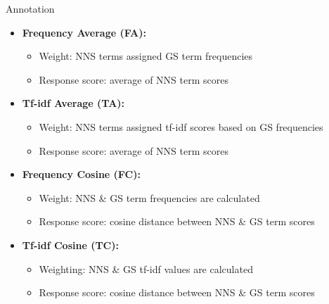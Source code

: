 \documentclass[final,t]{beamer}
\begin{document}
\begin{frame}{}
\begin{columns}[t]
\begin{column}{.64\linewidth}
\begin{columns}
\begin{column}{.48\linewidth}
\begin{block}{Annotation}
\begin{center}
\begin{minipage}{.78\textwidth}
  \begin{mdframed}[innertopmargin=15pt,innerbottommargin=15pt,roundcorner=10pt]
  \begin{center}
  \begin{minipage}{.9\textwidth}
    \begin{itemize}
    \item \textbf{Frequency Average (FA):} 
        \begin{itemize}
        \item Weight: NNS terms assigned GS term frequencies
        \item Response score: average of NNS term scores
        \end{itemize}
      \item \textbf{Tf-idf Average (TA):} 
        \begin{itemize}
        \item Weight: NNS terms assigned tf-idf scores based on GS
          frequencies
        \item Response score: average of NNS term scores
        \end{itemize}
      \item \textbf{Frequency Cosine (FC):} 
        \begin{itemize}
        \item Weight: NNS \& GS term frequencies are calculated
        \item Response score: cosine distance between NNS \& GS term
          scores
        \end{itemize}
      \item \textbf{Tf-idf Cosine (TC):} 
        \begin{itemize}
        \item Weighting: NNS \& GS tf-idf values are calculated
        \item Response score: cosine distance between NNS \& GS term
          scores
        \end{itemize}
    \end{itemize}
  \end{minipage}
  \end{center}
  \end{mdframed}
\end{minipage}
\end{center}
\vspace{-.5em}
\end{block}


\end{column}
\end{columns}
\end{column}
\end{columns}
\end{frame}
\end{document}
